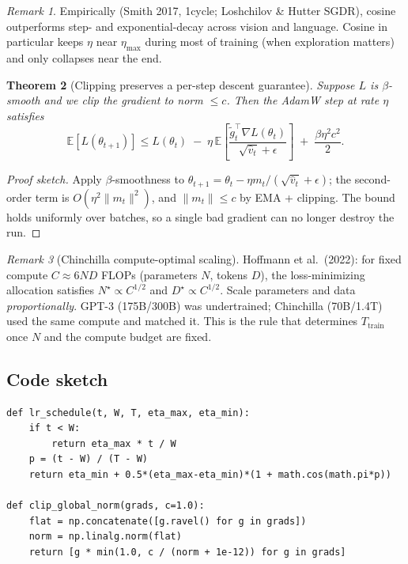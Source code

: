 \documentclass[11pt]{article}
\newtheorem{theorem}{Theorem}[section]
\theoremstyle{remark}
\newtheorem{remark}[theorem]{Remark}
\begin{document}
\begin{remark}
Empirically (Smith 2017, 1cycle; Loshchilov \& Hutter SGDR), cosine outperforms step- and exponential-decay across vision and language. Cosine in particular keeps $\eta$ near $\eta_{\max}$ during most of training (when exploration matters) and only collapses near the end.
\end{remark}

\begin{theorem}[Clipping preserves a per-step descent guarantee]
Suppose $L$ is $\beta$-smooth and we clip the gradient to norm $\le c$. Then the AdamW step at rate $\eta$ satisfies
\[
\mathbb{E}[L(\theta_{t+1})] \le L(\theta_t) \;-\; \eta\,\mathbb{E}\!\left[\frac{\widetilde g_t^{\top}\nabla L(\theta_t)}{\sqrt{\hat v_t}+\epsilon}\right] \;+\; \frac{\beta\eta^2 c^2}{2}.
\]
\end{theorem}

\begin{proof}[Proof sketch]
Apply $\beta$-smoothness to $\theta_{t+1}=\theta_t-\eta m_t/(\sqrt{\hat v_t}+\epsilon)$; the second-order term is $O(\eta^2\|m_t\|^2)$, and $\|m_t\|\le c$ by EMA + clipping. The bound holds uniformly over batches, so a single bad gradient can no longer destroy the run.
\end{proof}

\begin{remark}[Chinchilla compute-optimal scaling]
Hoffmann et al.\ (2022): for fixed compute $C\approx 6ND$ FLOPs (parameters $N$, tokens $D$), the loss-minimizing allocation satisfies $N^\star\propto C^{1/2}$ and $D^\star\propto C^{1/2}$. Scale parameters and data \emph{proportionally}. GPT-3 (175B/300B) was undertrained; Chinchilla (70B/1.4T) used the same compute and matched it. This is the rule that determines $T_{\text{train}}$ once $N$ and the compute budget are fixed.
\end{remark}

\subsection*{Code sketch}

\begin{verbatim}
def lr_schedule(t, W, T, eta_max, eta_min):
    if t < W:
        return eta_max * t / W
    p = (t - W) / (T - W)
    return eta_min + 0.5*(eta_max-eta_min)*(1 + math.cos(math.pi*p))

def clip_global_norm(grads, c=1.0):
    flat = np.concatenate([g.ravel() for g in grads])
    norm = np.linalg.norm(flat)
    return [g * min(1.0, c / (norm + 1e-12)) for g in grads]
\end{verbatim}
\end{document}
